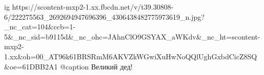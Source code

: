  
 
 
 
 

\ifcmt
  ig https://scontent-mxp2-1.xx.fbcdn.net/v/t39.30808-6/222275563_2692694947696396_4306438482775973619_n.jpg?_nc_cat=104&ccb=1-5&_nc_sid=b9115d&_nc_ohc=JAhnClO9GSYAX_aWKdv&_nc_ht=scontent-mxp2-1.xx&oh=00_AT96k61BRSRmM6AKVZkWGwiXuHwNoQQlUghGxbdCicZ8SQ&oe=61DBB2A1
	@caption Великий дед!
\fi
